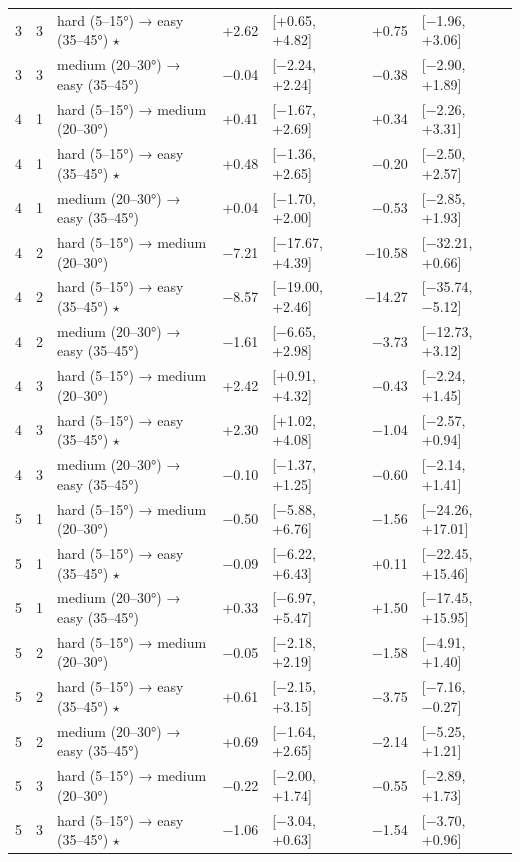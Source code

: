 \begin{table}[htbp]
\begin{tabular}{rllrlrl}
    3 & 3 & hard (5–15°) → easy (35–45°) $\star$ & +2.62 & [+0.65, +4.82] & +0.75 & [−1.96, +3.06] \\
    3 & 3 & medium (20–30°) → easy (35–45°) & −0.04 & [−2.24, +2.24] & −0.38 & [−2.90, +1.89] \\
    4 & 1 & hard (5–15°) → medium (20–30°) & +0.41 & [−1.67, +2.69] & +0.34 & [−2.26, +3.31] \\
    4 & 1 & hard (5–15°) → easy (35–45°) $\star$ & +0.48 & [−1.36, +2.65] & −0.20 & [−2.50, +2.57] \\
    4 & 1 & medium (20–30°) → easy (35–45°) & +0.04 & [−1.70, +2.00] & −0.53 & [−2.85, +1.93] \\
    4 & 2 & hard (5–15°) → medium (20–30°) & −7.21 & [−17.67, +4.39] & −10.58 & [−32.21, +0.66] \\
    4 & 2 & hard (5–15°) → easy (35–45°) $\star$ & −8.57 & [−19.00, +2.46] & −14.27 & [−35.74, −5.12] \\
    4 & 2 & medium (20–30°) → easy (35–45°) & −1.61 & [−6.65, +2.98] & −3.73 & [−12.73, +3.12] \\
    4 & 3 & hard (5–15°) → medium (20–30°) & +2.42 & [+0.91, +4.32] & −0.43 & [−2.24, +1.45] \\
    4 & 3 & hard (5–15°) → easy (35–45°) $\star$ & +2.30 & [+1.02, +4.08] & −1.04 & [−2.57, +0.94] \\
    4 & 3 & medium (20–30°) → easy (35–45°) & −0.10 & [−1.37, +1.25] & −0.60 & [−2.14, +1.41] \\
    5 & 1 & hard (5–15°) → medium (20–30°) & −0.50 & [−5.88, +6.76] & −1.56 & [−24.26, +17.01] \\
    5 & 1 & hard (5–15°) → easy (35–45°) $\star$ & −0.09 & [−6.22, +6.43] & +0.11 & [−22.45, +15.46] \\
    5 & 1 & medium (20–30°) → easy (35–45°) & +0.33 & [−6.97, +5.47] & +1.50 & [−17.45, +15.95] \\
    5 & 2 & hard (5–15°) → medium (20–30°) & −0.05 & [−2.18, +2.19] & −1.58 & [−4.91, +1.40] \\
    5 & 2 & hard (5–15°) → easy (35–45°) $\star$ & +0.61 & [−2.15, +3.15] & −3.75 & [−7.16, −0.27] \\
    5 & 2 & medium (20–30°) → easy (35–45°) & +0.69 & [−1.64, +2.65] & −2.14 & [−5.25, +1.21] \\
    5 & 3 & hard (5–15°) → medium (20–30°) & −0.22 & [−2.00, +1.74] & −0.55 & [−2.89, +1.73] \\
    5 & 3 & hard (5–15°) → easy (35–45°) $\star$ & −1.06 & [−3.04, +0.63] & −1.54 & [−3.70, +0.96] \\

\end{tabular}
\end{table}
